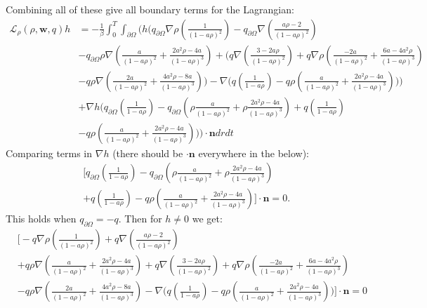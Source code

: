 \documentclass[11pt, a4paper]{article}
\theoremstyle{definition}
\newcommand{\w}{\mathbf{w}}
\newcommand{\n}{\mathbf{n}}
\begin{document}
Combining all of these give all boundary terms for the Lagrangian:
\begin{align*}
	\mathcal{L}_\rho (\rho,\w,q)h &= - \frac{1}{\beta}\int_0^T \int_{\partial \Omega} \bigg( h \bigg(  q_{\partial \Omega}\nabla \rho \left( \frac{1}{(1 -a \rho)^2} \right)- q_{\partial \Omega} \nabla \left(\frac{a \rho  - 2}{(1- a \rho)^2}\right) \\
	&-  q_{\partial \Omega}\rho \nabla \left( \frac{a}{(1- a \rho)^2} + \frac{2a^2\rho - 4a}{(1- a \rho)^3} \right)
	+ \bigg( q  \nabla \left( \frac{3-2a\rho}{(1-a\rho)^2} \right) + q \nabla \rho  \left( \frac{-2a }{(1-a\rho)^2} + \frac{6a-4a^2  \rho}{(1-a\rho)^3}  \right)\\
	&- q\rho \nabla \left(\frac{2a }{(1-a\rho)^2} + \frac{4a^2\rho -8a}{(1-a\rho)^3} \right) \bigg) -  \nabla \bigg(q \left(\frac{1}{1- a\rho} \right)  - q\rho  \left(\frac{a }{(1-a\rho)^2} + \frac{2a^2\rho -4a}{(1-a\rho)^3} \right)  \bigg)	\bigg)\\
	& +\nabla h \bigg( q_{\partial \Omega} \left(\frac{1}{1 - a\rho}\right) - q_{\partial \Omega}\left( \rho \frac{a}{(1- a \rho)^2} + \rho\frac{2a^2\rho - 4a}{(1- a \rho)^3} \right) +q \left(\frac{1}{1- a\rho} \right) \\
	& - q\rho  \left(\frac{a }{(1-a\rho)^2} + \frac{2a^2\rho -4a}{(1-a\rho)^3} \right)  \bigg) \bigg) \cdot \n dr dt
\end{align*}
Comparing terms in $\nabla h$ (there should be $\cdot \n$ everywhere in the below):
\begin{align*}
	&\bigg[q_{\partial \Omega} \left(\frac{1}{1 - a\rho}\right) - q_{\partial \Omega}\left( \rho \frac{a}{(1- a \rho)^2} + \rho\frac{2a^2\rho - 4a}{(1- a \rho)^3} \right) \\
	&+q \left(\frac{1}{1- a\rho} \right)  - q\rho  \left(\frac{a }{(1-a\rho)^2} + \frac{2a^2\rho -4a}{(1-a\rho)^3} \right) \bigg] \cdot \n = 0.
\end{align*}
This holds when $q_{\partial \Omega} = -q$.
Then for $h \neq 0$ we get:
\begin{align*}
	&\bigg[-q\nabla \rho \left( \frac{1}{(1 -a \rho)^2} \right)+q \nabla \left(\frac{a \rho  - 2}{(1- a \rho)^2}\right) \\
	&+q\rho \nabla \left( \frac{a}{(1- a \rho)^2} + \frac{2a^2\rho - 4a}{(1- a \rho)^3} \right)
	+  q  \nabla \left( \frac{3-2a\rho}{(1-a\rho)^2} \right) + q \nabla \rho  \left( \frac{-2a }{(1-a\rho)^2} + \frac{6a-4a^2  \rho}{(1-a\rho)^3}  \right)\\
	&- q\rho \nabla \left(\frac{2a }{(1-a\rho)^2} + \frac{4a^2\rho -8a}{(1-a\rho)^3} \right) -  \nabla \bigg(q \left(\frac{1}{1- a\rho} \right)  - q\rho  \left(\frac{a }{(1-a\rho)^2} + \frac{2a^2\rho -4a}{(1-a\rho)^3} \right) \bigg)\bigg] \cdot \n = 0
\end{align*}
\end{document}
